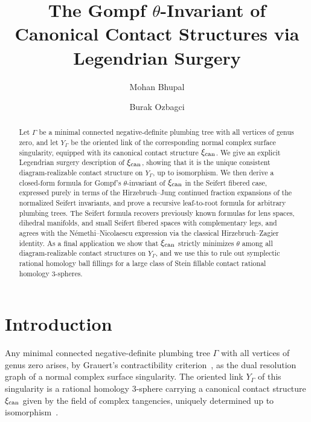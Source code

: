 \documentclass[11pt]{amsart}
\theoremstyle{plain}
\theoremstyle{definition}
\theoremstyle{remark}
\begin{document}
\title{The Gompf $\theta$-Invariant of Canonical Contact Structures via Legendrian Surgery}

\author{Mohan Bhupal}
\address{Department of Mathematics, METU, Ankara, Turkey}

\author{Burak Ozbagci}
\address{Department of Mathematics, Ko\c{c} University, Istanbul, Turkey}


\begin{abstract}
Let $\Gamma$ be a minimal connected negative-definite plumbing tree
with all vertices of genus zero, and let $Y_\Gamma$ be the oriented
link of the corresponding normal complex surface singularity, equipped
with its canonical contact structure $\xi_{\rm can}$. We give
an explicit Legendrian surgery description of $\xi_{\rm can}$,
showing that it is the unique consistent diagram-realizable contact
structure on $Y_\Gamma$, up to isomorphism.  We then derive a closed-form formula for
Gompf's $\theta$-invariant of $\xi_{\rm can}$ in the Seifert
fibered case, expressed purely in terms of the Hirzebruch--Jung
continued fraction expansions of the normalized Seifert invariants,
and prove a recursive leaf-to-root formula for arbitrary plumbing
trees. The Seifert formula recovers previously known formulas for
lens spaces, dihedral manifolds, and small Seifert fibered spaces
with complementary legs, and agrees with the N\'emethi--Nicolaescu
expression via the classical Hirzebruch--Zagier identity. As a final
application we show that $\xi_{\rm can}$ strictly minimizes
$\theta$ among all diagram-realizable contact structures on
$Y_\Gamma$, and we use this to rule out symplectic rational homology
ball fillings for a large class of Stein fillable contact rational
homology $3$-spheres.
\end{abstract}

\maketitle

\section{Introduction}\label{sec:intro}

Any minimal connected negative-definite plumbing tree $\Gamma$ with
all vertices of genus zero arises, by Grauert's contractibility
criterion~\cite{Grauert1962}, as the dual resolution graph of a normal
complex surface singularity. The oriented link $Y_\Gamma$ of this
singularity is a rational homology $3$-sphere carrying a canonical
contact structure $\xi_{\rm can}$ given by the field of
complex tangencies, uniquely determined up to isomorphism~\cite{CaubelNemethiPopescu-Pampu2006}.
\end{document}
